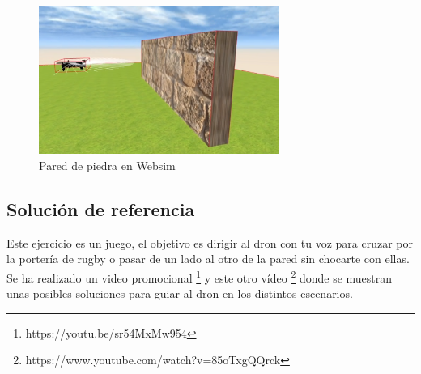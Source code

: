 \begin{figure}[H]
\centering
    \includegraphics[width=0.7\textwidth, height=0.5\textwidth]{chapters/images/pared.png}
    \caption{Pared de piedra en Websim}
    \label{fig:f1}
  \end{figure}



\subsection{Solución de referencia}

Este ejercicio es un juego, el objetivo es dirigir al dron con tu voz para cruzar por la portería de rugby o pasar de un lado al otro de la pared sin chocarte con ellas. Se ha realizado un video promocional \footnote{https://youtu.be/sr54MxMw954} y este otro vídeo \footnote{https://www.youtube.com/watch?v=85oTxgQQrck} donde se muestran unas posibles soluciones para guiar al dron en los distintos escenarios.


